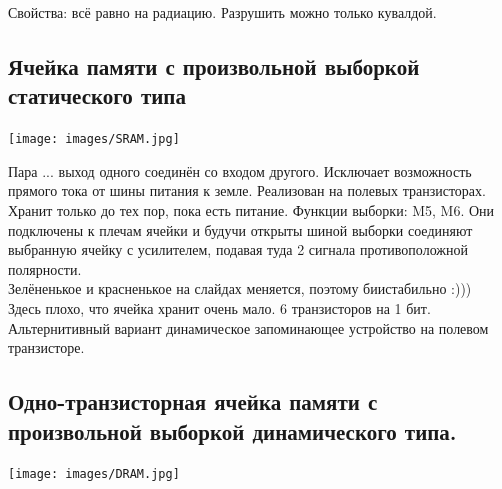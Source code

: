 \documentclass[12px]{article}
\begin{document}
Свойства: 
всё равно на радиацию. Разрушить можно только кувалдой. 
\subsection{Ячейка памяти с произвольной выборкой статического типа}
\begin{center}
	\texttt{[image: images/SRAM.jpg]}
\end{center}

Пара ... выход одного соединён со входом другого. 
Исключает возможность прямого тока от шины питания к земле. Реализован на полевых транзисторах. Хранит только до тех пор, пока есть питание. 
Функции выборки: M5, M6. Они подключены к плечам ячейки и будучи открыты шиной выборки соединяют выбранную ячейку с усилителем, подавая туда 2 сигнала противоположной полярности.\\

Зелёненькое и красненькое на слайдах меняется, поэтому биистабильно :)))\\

Здесь плохо, что ячейка хранит очень мало. 6 транзисторов на 1 бит.\\
Альтернитивный вариант динамическое запоминающее устройство на полевом транзисторе. 

\subsection{Одно-транзисторная ячейка памяти с произвольной выборкой динамического типа.}
\begin{center}
	\texttt{[image: images/DRAM.jpg]}
\end{center}
\end{document}
